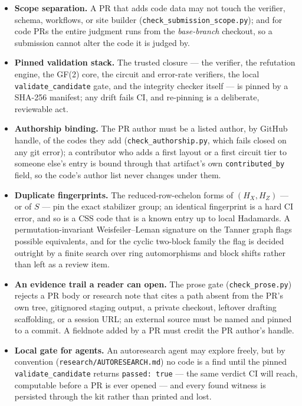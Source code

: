 \documentclass[11pt]{article}
\newcommand{\HX}{H_X}
\newcommand{\HZ}{H_Z}
\begin{document}
	\begin{itemize}[nosep]
		\item \textbf{Scope separation.} A PR that adds code data may not
		touch the verifier, schema, workflows, or site builder
		(\texttt{check\_submission\_scope.py}); and for code PRs the entire
		judgment runs from the \emph{base-branch} checkout, so a submission
		cannot alter the code it is judged by.
		\item \textbf{Pinned validation stack.} The trusted closure --- the
		verifier, the refutation engine, the GF(2) core, the circuit and
		error-rate verifiers, the local \texttt{validate\_candidate} gate,
		and the integrity checker itself --- is pinned by a SHA-256 manifest;
		any drift fails CI, and re-pinning is a deliberate, reviewable act.
		\item \textbf{Authorship binding.} The PR author must be a listed
		author, by GitHub handle, of the codes they add
		(\texttt{check\_authorship.py}, which fails closed on any git error);
		a contributor who adds a first layout or a first circuit tier to
		someone else's entry is bound through that artifact's own
		\texttt{contributed\_by} field, so the code's author list never
		changes under them.
		\item \textbf{Duplicate fingerprints.} The reduced-row-echelon forms
		of $(\HX,\HZ)$ --- or of $S$ --- pin the exact stabilizer group; an
		identical fingerprint is a hard CI error, and so is a CSS code that
		is a known entry up to local Hadamards. A permutation-invariant
		Weisfeiler--Leman signature on the Tanner graph flags possible
		equivalents, and for the cyclic two-block family the flag is decided
		outright by a finite search over ring automorphisms and block shifts
		rather than left as a review item.
		\item \textbf{An evidence trail a reader can open.} The prose gate
		(\texttt{check\_prose.py}) rejects a PR body or research note that
		cites a path absent from the PR's own tree, gitignored staging
		output, a private checkout, leftover drafting scaffolding, or a
		session URL; an external source must be named and pinned to a
		commit. A fieldnote added by a PR must credit the PR author's handle.
		\item \textbf{Local gate for agents.} An autoresearch agent may
		explore freely, but by convention (\texttt{research/AUTORESEARCH.md})
		no code is a find until the pinned \texttt{validate\_candidate}
		returns \texttt{passed:\,true} --- the same verdict CI will reach,
		computable before a PR is ever opened --- and every found witness is
		persisted through the kit rather than printed and lost.
	\end{itemize}
\end{document}
